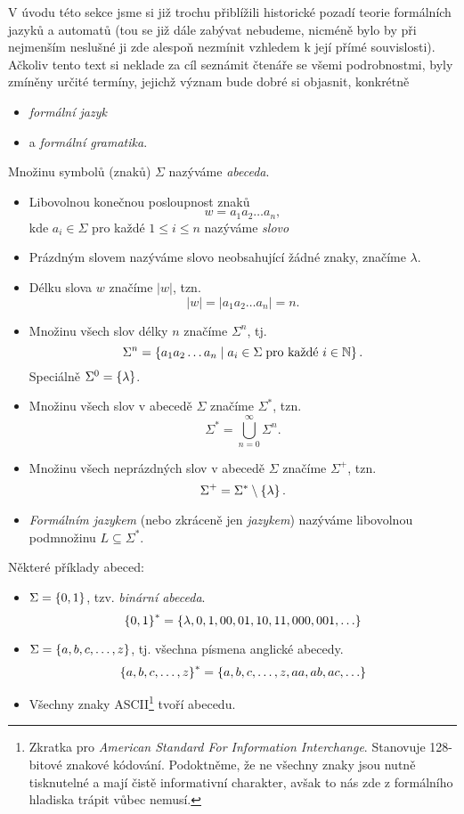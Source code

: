 V úvodu této sekce jsme si již trochu přiblížili historické pozadí teorie formálních jazyků a automatů (tou se již dále zabývat nebudeme, nicméně bylo by při nejmenším neslušné ji zde alespoň nezmínit vzhledem k její přímé souvislosti). Ačkoliv tento text si neklade za cíl seznámit čtenáře se všemi podrobnostmi, byly zmíněny určité termíny, jejichž význam bude dobré si objasnit, konkrétně
\begin{itemize}
    \item \emph{formální jazyk}
    \item a \emph{formální gramatika}.
\end{itemize}
\begin{definition}\label{def:formalni-jazyk-etc}
    Množinu symbolů (znaků) $\Sigma$ nazýváme \emph{abeceda}.
    \begin{itemize}
        \item Libovolnou konečnou posloupnost znaků
        \[w=a_1a_2\ldots a_n,\]
        kde $a_i\in\Sigma$ pro každé $1\leqslant i\leqslant n$ nazýváme \emph{slovo}
        \item Prázdným slovem nazýváme slovo neobsahující žádné znaky, značíme $\lambda$.
        \item Délku slova $w$ značíme $|w|$, tzn.
        \[|w|=|a_1a_2\ldots a_n|=n.\]
        \item Množinu všech slov délky $n$ značíme $\Sigma^n$, tj.
        \[\Sigma^n=\left\{a_1a_2\ldots a_n\mid a_i\in\Sigma\;\text{pro každé $i\in\mathbb{N}$}\right\}.\]
        Speciálně $\Sigma^0=\left\{\lambda\right\}$.
        \item Množinu všech slov v abecedě $\Sigma$ značíme $\Sigma^*$, tzn.
        \[\Sigma^*=\bigcup_{n=0}^\infty\Sigma^n.\]
        \item Množinu všech neprázdných slov v abecedě $\Sigma$ značíme $\Sigma^+$, tzn.
        \[\Sigma^+=\Sigma^*\setminus\left\{\lambda\right\}.\]
        \item \emph{Formálním jazykem} (nebo zkráceně jen \emph{jazykem}) nazýváme libovolnou podmnožinu $L\subseteq\Sigma^*$.
    \end{itemize}
\end{definition}
\begin{example}
    Některé příklady abeced:
    \begin{itemize}
        \item $\Sigma=\left\{0,1\right\}$, tzv. \emph{binární abeceda}.
        \[\left\{0,1\right\}^*=\left\{\lambda,0,1,00,01,10,11,000,001,\ldots\right\}\]
        \item $\Sigma=\left\{a,b,c,\ldots,z\right\}$, tj. všechna písmena anglické abecedy.
        \[\left\{a,b,c,\ldots,z\right\}^*=\left\{a,b,c,\ldots,z,aa,ab,ac,\ldots\right\}\]
        \item Všechny znaky ASCII\footnote{Zkratka pro \emph{American Standard For Information Interchange}. Stanovuje 128-bitové znakové kódování. Podoktněme, že ne všechny znaky jsou nutně tisknutelné a mají čistě informativní charakter, avšak to nás zde z formálního hladiska trápit vůbec nemusí.} tvoří abecedu.
    \end{itemize}
\end{example}
